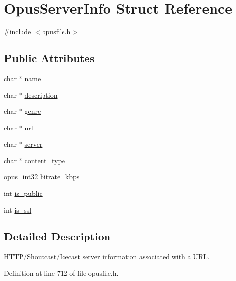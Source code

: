 \hypertarget{struct_opus_server_info}{}\section{Opus\+Server\+Info Struct Reference}
\label{struct_opus_server_info}


{\ttfamily \#include $<$opusfile.\+h$>$}

\subsection*{Public Attributes}
\begin{DoxyCompactItemize}
\item 
char $\ast$ \mbox{\hyperlink{struct_opus_server_info_a6c1e013bd64991b75709ef1d76f962b6}{name}}
\item 
char $\ast$ \mbox{\hyperlink{struct_opus_server_info_ab16d58f0d67d6473e12629676e2641ca}{description}}
\item 
char $\ast$ \mbox{\hyperlink{struct_opus_server_info_a293431ddf20c3baa3a4751ad08f518bb}{genre}}
\item 
char $\ast$ \mbox{\hyperlink{struct_opus_server_info_a7f9aef47413c849bb240ef70394401b1}{url}}
\item 
char $\ast$ \mbox{\hyperlink{struct_opus_server_info_a7aa583abd214ca9cefab6c1c99097202}{server}}
\item 
char $\ast$ \mbox{\hyperlink{struct_opus_server_info_a5f0120b006af1122cbdc72f3cbb68fd7}{content\+\_\+type}}
\item 
\mbox{\hyperlink{opus__types_8h_aa4d309d6f80b99dbabebc8f98879ab9a}{opus\+\_\+int32}} \mbox{\hyperlink{struct_opus_server_info_a1cf5db210f1cad5cf809bf54ddff68de}{bitrate\+\_\+kbps}}
\item 
int \mbox{\hyperlink{struct_opus_server_info_a9e81d2992f3009847c30bb4b0dc5c7de}{is\+\_\+public}}
\item 
int \mbox{\hyperlink{struct_opus_server_info_a3bce31c0a77548625a4d8125251e9b11}{is\+\_\+ssl}}
\end{DoxyCompactItemize}


\subsection{Detailed Description}
H\+T\+T\+P/\+Shoutcast/\+Icecast server information associated with a U\+RL. 

Definition at line 712 of file opusfile.\+h.




